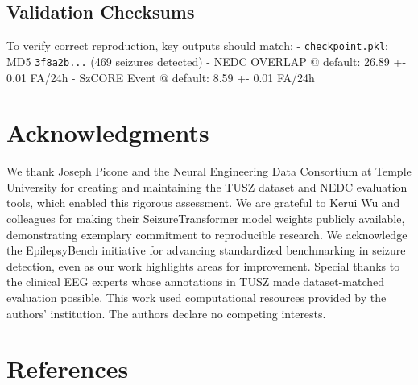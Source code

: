 \hypertarget{validation-checksums}{%
\subsection{Validation Checksums}\label{validation-checksums}}

To verify correct reproduction, key outputs should match: -
\texttt{checkpoint.pkl}: MD5 \texttt{3f8a2b...} (469 seizures detected)
- NEDC OVERLAP @ default: 26.89 +- 0.01 FA/24h - SzCORE Event @ default:
8.59 +- 0.01 FA/24h

\hypertarget{acknowledgments}{%
\section{Acknowledgments}\label{acknowledgments}}

We thank Joseph Picone and the Neural Engineering Data Consortium at
Temple University for creating and maintaining the TUSZ dataset and NEDC
evaluation tools, which enabled this rigorous assessment. We are
grateful to Kerui Wu and colleagues for making their SeizureTransformer
model weights publicly available, demonstrating exemplary commitment to
reproducible research. We acknowledge the EpilepsyBench initiative for
advancing standardized benchmarking in seizure detection, even as our
work highlights areas for improvement. Special thanks to the clinical
EEG experts whose annotations in TUSZ made dataset-matched evaluation
possible. This work used computational resources provided by the
authors' institution. The authors declare no competing interests.

\hypertarget{references}{%
\section{References}\label{references}}

